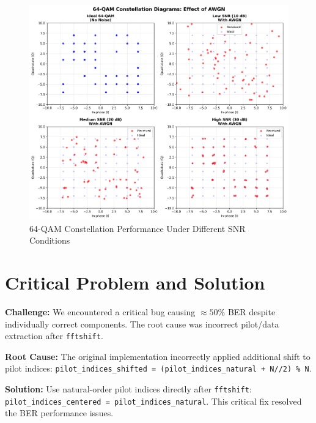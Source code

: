 \documentclass[11pt,a4paper]{article}
\begin{document}
\begin{figure}[H]
    \centering
    \includegraphics[width=\textwidth]{constellation_comparison.png}
    \caption{64-QAM Constellation Performance Under Different SNR Conditions}
    \label{fig:constellation_comparison}
\end{figure}

\section{Critical Problem and Solution}

\textbf{Challenge:} We encountered a critical bug causing $\approx 50\%$ BER despite individually correct components. The root cause was incorrect pilot/data extraction after \texttt{fftshift}.

\textbf{Root Cause:} The original implementation incorrectly applied additional shift to pilot indices: \texttt{pilot\_indices\_shifted = (pilot\_indices\_natural + N//2) \% N}.

\textbf{Solution:} Use natural-order pilot indices directly after \texttt{fftshift}: \texttt{pilot\_indices\_centered = pilot\_indices\_natural}. This critical fix resolved the BER performance issues.
\end{document}

